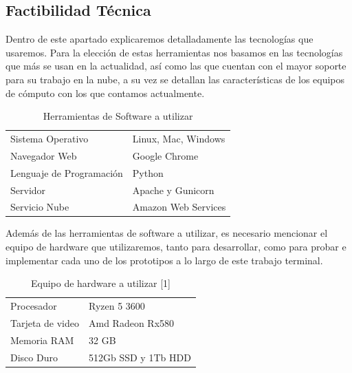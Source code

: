 \documentclass[12pt, a4paper, titlepage]{report}
\begin{document}
    	\subsection{Factibilidad Técnica}
    	Dentro de este apartado explicaremos detalladamente las tecnologías que usaremos. Para la elección de estas herramientas nos basamos en las tecnologías que más se usan en la actualidad, así como las que cuentan con el mayor soporte para su trabajo en la nube, a su vez se detallan las características de los equipos de c\'omputo con los que contamos actualmente.
    	\begin{table}[H]
    		\begin{tabular}{ |p{3.5cm}|p{9.5cm}|}
    			\hline
    			\rowcolor{guindapoli}
    			\multicolumn{2}{|c|}{\textbf{\textcolor{white}{Factibilidad T\'ecnica}}}\\
    			\hline
    			\cellcolor{azulclaro}Sistema Operativo & 
    			Linux, Mac, Windows \\ 
    			\hline
    			\cellcolor{azulclaro}Navegador Web &
    			Google Chrome\\
    			\hline
    			\cellcolor{azulclaro}Lenguaje de Programaci\'on &
    			Python\\
    			\hline
    			\cellcolor{azulclaro}Servidor &
    			Apache y Gunicorn\\
    			\hline
    			\cellcolor{azulclaro}Servicio Nube &
    			Amazon Web Services\\
    			\hline
    			
    		\end{tabular}
    		\caption[Herramientas de Software]{Herramientas de Software a utilizar}
    	\end{table}
    	Además de las herramientas de software a utilizar, es necesario mencionar el equipo de hardware que utilizaremos, tanto para desarrollar, como para probar e implementar cada uno de los prototipos a lo largo de este trabajo terminal.
    	\begin{table}[H]
    		\begin{tabular}{ |p{3.5cm}|p{9.5cm}|}
    			\hline
    			\rowcolor{guindapoli}
    			\multicolumn{2}{|c|}{\textbf{\textcolor{white}{Equipo de hardware [1]}}}\\
    			\hline
    			\cellcolor{azulclaro}Procesador &
    			Ryzen 5 3600\\
    			\hline
    			\cellcolor{azulclaro}Tarjeta de video & 
    			Amd Radeon Rx580\\
    			\hline
    			\cellcolor{azulclaro}Memoria RAM &
    			32 GB\\
    			\hline
    			\cellcolor{azulclaro}Disco Duro &
    			512Gb SSD y 1Tb HDD\\
    			\hline
    		\end{tabular}
    		\caption[Equipo de Hardware 1]{Equipo de hardware a utilizar [1]}
    	\end{table}
\end{document}
